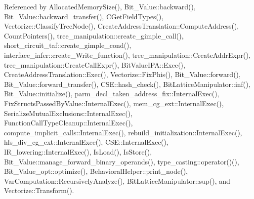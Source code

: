 Referenced by Allocated\+Memory\+Size(), Bit\+\_\+\+Value\+::backward(), Bit\+\_\+\+Value\+::backward\+\_\+transfer(), C\+Get\+Field\+Types(), Vectorize\+::\+Classify\+Tree\+Node(), Create\+Address\+Translation\+::\+Compute\+Address(), Count\+Pointers(), tree\+\_\+manipulation\+::create\+\_\+gimple\+\_\+call(), short\+\_\+circuit\+\_\+taf\+::create\+\_\+gimple\+\_\+cond(), interface\+\_\+infer\+::create\+\_\+\+Write\+\_\+function(), tree\+\_\+manipulation\+::\+Create\+Addr\+Expr(), tree\+\_\+manipulation\+::\+Create\+Call\+Expr(), Bit\+Value\+I\+P\+A\+::\+Exec(), Create\+Address\+Translation\+::\+Exec(), Vectorize\+::\+Fix\+Phis(), Bit\+\_\+\+Value\+::forward(), Bit\+\_\+\+Value\+::forward\+\_\+transfer(), C\+S\+E\+::hash\+\_\+check(), Bit\+Lattice\+Manipulator\+::inf(), Bit\+\_\+\+Value\+::initialize(), parm\+\_\+decl\+\_\+taken\+\_\+address\+\_\+fix\+::\+Internal\+Exec(), Fix\+Structs\+Passed\+By\+Value\+::\+Internal\+Exec(), mem\+\_\+cg\+\_\+ext\+::\+Internal\+Exec(), Serialize\+Mutual\+Exclusions\+::\+Internal\+Exec(), Function\+Call\+Type\+Cleanup\+::\+Internal\+Exec(), compute\+\_\+implicit\+\_\+calls\+::\+Internal\+Exec(), rebuild\+\_\+initialization\+::\+Internal\+Exec(), hls\+\_\+div\+\_\+cg\+\_\+ext\+::\+Internal\+Exec(), C\+S\+E\+::\+Internal\+Exec(), I\+R\+\_\+lowering\+::\+Internal\+Exec(), Is\+Load(), Is\+Store(), Bit\+\_\+\+Value\+::manage\+\_\+forward\+\_\+binary\+\_\+operands(), type\+\_\+casting\+::operator()(), Bit\+\_\+\+Value\+\_\+opt\+::optimize(), Behavioral\+Helper\+::print\+\_\+node(), Var\+Computation\+::\+Recursively\+Analyze(), Bit\+Lattice\+Manipulator\+::sup(), and Vectorize\+::\+Transform().

